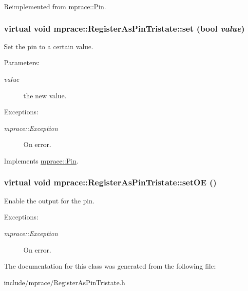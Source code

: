 Reimplemented from \hyperlink{classmprace_1_1Pin_a3}{mprace::Pin}.\hypertarget{classmprace_1_1RegisterAsPinTristate_a2}{
\subsubsection[set]{\setlength{\rightskip}{0pt plus 5cm}virtual void mprace::Register\-As\-Pin\-Tristate::set (bool {\em value})}}
\label{classmprace_1_1RegisterAsPinTristate_a2}


Set the pin to a certain value. 

\begin{Desc}
\item[Parameters:]
\begin{description}
\item[{\em value}]the new value. \end{description}
\end{Desc}
\begin{Desc}
\item[Exceptions:]
\begin{description}
\item[{\em mprace::Exception}]On error.\end{description}
\end{Desc}


Implements \hyperlink{classmprace_1_1Pin_a1}{mprace::Pin}.\hypertarget{classmprace_1_1RegisterAsPinTristate_a3}{
\subsubsection[setOE]{\setlength{\rightskip}{0pt plus 5cm}virtual void mprace::Register\-As\-Pin\-Tristate::set\-OE ()}}
\label{classmprace_1_1RegisterAsPinTristate_a3}


Enable the output for the pin. 

\begin{Desc}
\item[Exceptions:]
\begin{description}
\item[{\em mprace::Exception}]On error.\end{description}
\end{Desc}


The documentation for this class was generated from the following file:\begin{CompactItemize}
\item 
include/mprace/Register\-As\-Pin\-Tristate.h\end{CompactItemize}
